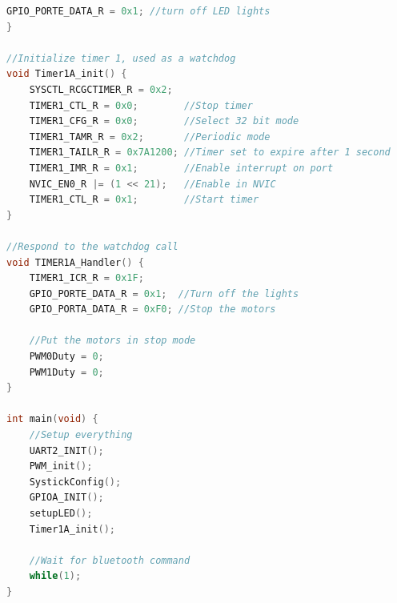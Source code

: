 \documentclass[12pt]{article}
\begin{document}
\begin{lstlisting}[language=c]
	GPIO_PORTE_DATA_R = 0x1; //turn off LED lights
}

//Initialize timer 1, used as a watchdog
void Timer1A_init() {
	SYSCTL_RCGCTIMER_R = 0x2;
	TIMER1_CTL_R = 0x0;        //Stop timer
	TIMER1_CFG_R = 0x0;        //Select 32 bit mode
	TIMER1_TAMR_R = 0x2;       //Periodic mode
	TIMER1_TAILR_R = 0x7A1200; //Timer set to expire after 1 second
	TIMER1_IMR_R = 0x1;        //Enable interrupt on port
	NVIC_EN0_R |= (1 << 21);   //Enable in NVIC
	TIMER1_CTL_R = 0x1;        //Start timer
}

//Respond to the watchdog call
void TIMER1A_Handler() {
	TIMER1_ICR_R = 0x1F;
	GPIO_PORTE_DATA_R = 0x1;  //Turn off the lights
	GPIO_PORTA_DATA_R = 0xF0; //Stop the motors

	//Put the motors in stop mode
	PWM0Duty = 0;
	PWM1Duty = 0;
}

int main(void) {
	//Setup everything
	UART2_INIT();
	PWM_init();
	SystickConfig();
	GPIOA_INIT();
	setupLED();
	Timer1A_init();

	//Wait for bluetooth command
	while(1);
}
\end{lstlisting}
\end{document}

